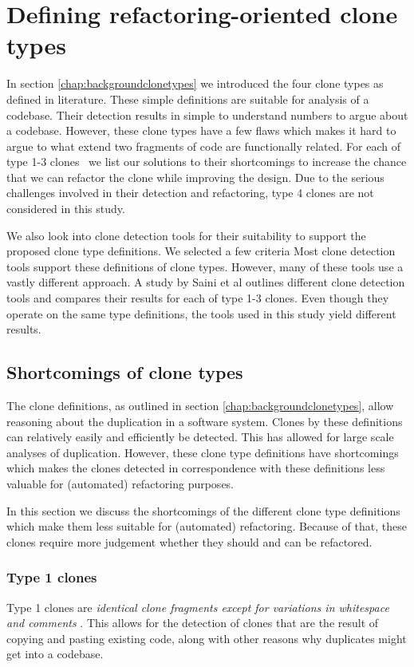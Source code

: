 \chapter{Defining refactoring-oriented clone types}\label{chap:clonetypes}
In section \ref{chap:backgroundclonetypes} we introduced the four clone types as defined in literature. These simple definitions are suitable for analysis of a codebase. Their detection results in simple to understand numbers to argue about a codebase. However, these clone types have a few flaws which makes it hard to argue to what extend two fragments of code are functionally related. For each of type 1-3 clones~\cite{roy2007survey} we list our solutions to their shortcomings to increase the chance that we can refactor the clone while improving the design. Due to the serious challenges involved in their detection and refactoring, type 4 clones are not considered in this study.

We also look into clone detection tools for their suitability to support the proposed clone type definitions. We selected a few criteria  Most clone detection tools support these definitions of clone types. However, many of these tools use a vastly different approach. A study by Saini et al \cite{saini2018towards} outlines different clone detection tools and compares their results for each of type 1-3 clones. Even though they operate on the same type definitions, the tools used in this study yield different results.

\section{Shortcomings of clone types}
The clone definitions, as outlined in section \ref{chap:backgroundclonetypes}, allow reasoning about the duplication in a software system. Clones by these definitions can relatively easily and efficiently be detected. This has allowed for large scale analyses of duplication. However, these clone type definitions have shortcomings which makes the clones detected in correspondence with these definitions less valuable for (automated) refactoring purposes.

In this section we discuss the shortcomings of the different clone type definitions which make them less suitable for (automated) refactoring. Because of that, these clones require more judgement whether they should and can be refactored.

\subsection{Type 1 clones} \label{chap:type1clones}
Type 1 clones are \textit{identical clone fragments except for variations in whitespace and comments} \cite{roy2007survey}. This allows for the detection of clones that are the result of copying and pasting existing code, along with other reasons why duplicates might get into a codebase.

